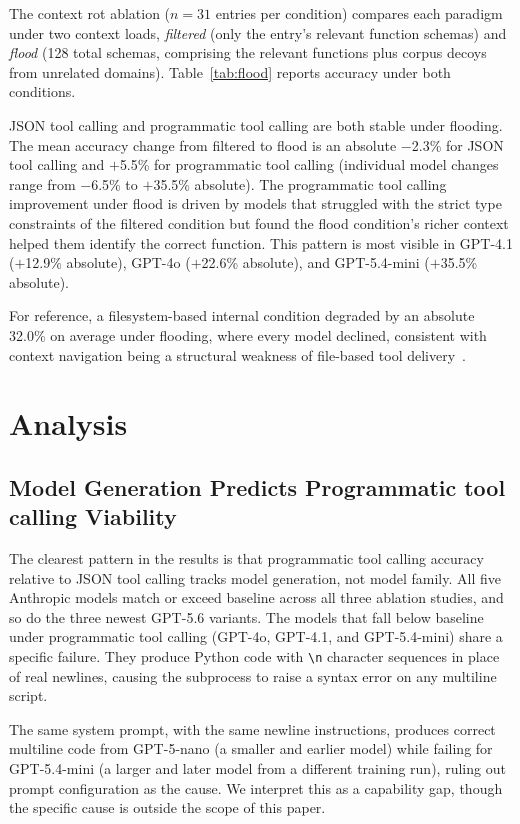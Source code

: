 \documentclass[11pt]{article}
\newcommand{\codemode}{programmatic tool calling}
\newcommand{\Codemode}{Programmatic tool calling}
\begin{document}
The context rot ablation ($n = 31$ entries per condition) compares each
paradigm under two context loads, \textit{filtered} (only the entry's relevant
function schemas) and \textit{flood} (128 total schemas, comprising the relevant
functions plus corpus decoys from unrelated domains).
Table~\ref{tab:flood} reports accuracy under both conditions.

JSON tool calling and \codemode{} are both stable under flooding. The mean accuracy change
from filtered to flood is an absolute $-$2.3\% for JSON tool calling and $+$5.5\% for
\codemode{} (individual model changes range from $-$6.5\% to $+$35.5\% absolute).
The \codemode{} improvement under flood is driven by models that struggled with the
strict type constraints of the filtered condition but found the flood condition's
richer context helped them identify the correct function. This pattern is most
visible in GPT-4.1 ($+$12.9\% absolute), GPT-4o ($+$22.6\% absolute), and GPT-5.4-mini
($+$35.5\% absolute).

For reference, a filesystem-based internal condition degraded by an absolute 32.0\% on
average under flooding, where every model declined, consistent with context navigation
being a structural weakness of file-based tool delivery~\citep{sen2026grep}.

\section{Analysis}

\subsection{Model Generation Predicts \Codemode{} Viability}

The clearest pattern in the results is that \codemode{} accuracy relative to
JSON tool calling tracks model generation, not model family.
All five Anthropic models match or exceed baseline across all three ablation studies,
and so do the three newest GPT-5.6 variants.
The models that fall below baseline under \codemode{} (GPT-4o, GPT-4.1, and
GPT-5.4-mini) share a specific failure. They produce Python code with
\texttt{\textbackslash n} character sequences in place of real newlines, causing
the subprocess to raise a syntax error on any multiline script.

The same system prompt, with the same newline instructions, produces correct
multiline code from GPT-5-nano (a smaller and earlier model) while failing for
GPT-5.4-mini (a larger and later model from a different training run), ruling out
prompt configuration as the cause.
We interpret this as a capability gap, though the specific cause is outside the scope of this paper.
\end{document}
